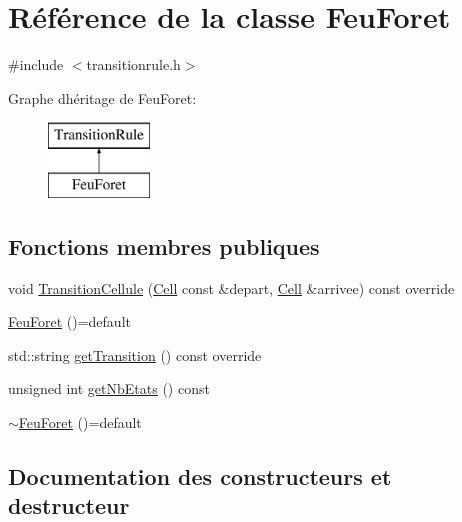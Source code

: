 \hypertarget{class_feu_foret}{}\section{Référence de la classe Feu\+Foret}
\label{class_feu_foret}


{\ttfamily \#include $<$transitionrule.\+h$>$}

Graphe d\textquotesingle{}héritage de Feu\+Foret\+:\begin{figure}[H]
\begin{center}
\leavevmode
\includegraphics[height=2.000000cm]{class_feu_foret}
\end{center}
\end{figure}
\subsection*{Fonctions membres publiques}
\begin{DoxyCompactItemize}
\item 
void \mbox{\hyperlink{class_feu_foret_a1fb3642690cc586faf0cbc6e9fae64cf}{Transition\+Cellule}} (\mbox{\hyperlink{class_cell}{Cell}} const \&depart, \mbox{\hyperlink{class_cell}{Cell}} \&arrivee) const override
\item 
\mbox{\hyperlink{class_feu_foret_a29b652f3ae76f3a0540e4ce7a0be6449}{Feu\+Foret}} ()=default
\item 
std\+::string \mbox{\hyperlink{class_feu_foret_ab793aa05ae4163ac380a6ce1a43ce19c}{get\+Transition}} () const override
\item 
unsigned int \mbox{\hyperlink{class_feu_foret_a5ad4bbdbb10a73abf63e15698d678bbd}{get\+Nb\+Etats}} () const
\item 
\mbox{\hyperlink{class_feu_foret_a641b5dbf3bd9da624dd1259cd8594d19}{$\sim$\+Feu\+Foret}} ()=default
\end{DoxyCompactItemize}


\subsection{Documentation des constructeurs et destructeur}
\mbox{\label{class_feu_foret_a29b652f3ae76f3a0540e4ce7a0be6449}} 
